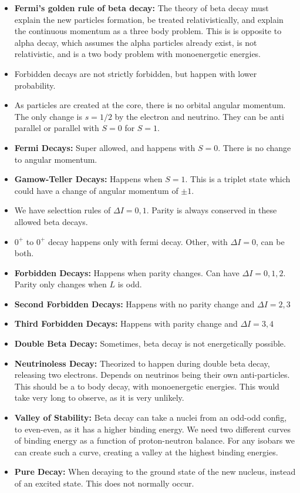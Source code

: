 \documentclass{article}
\begin{document}
\begin{itemize}
    \item \textbf{Fermi's golden rule of beta decay:} The theory of beta decay must explain the new particles formation, be treated relativistically, and explain the continuous momentum as a three body problem. This is is opposite to alpha decay, which assumes the alpha particles already exist, is not relativistic, and is a two body problem with monoenergetic energies. 
    \item Forbidden decays are not strictly forbidden, but happen with lower probability. 
    \item As particles are created at the core, there is no orbital angular momentum. The only change is $s = 1/2$ by the electron and neutrino. They can be anti parallel or parallel with $S = 0$ for $S = 1$. 
    \item \textbf{Fermi Decays:} Super allowed, and happens with $S = 0$. There is no change to angular momentum. 
    \item \textbf{Gamow-Teller Decays:} Happens when $S = 1$. This is a triplet state which could have a change of angular momentum of $±1$.
    \item We have selecttion rules of $ΔI = 0,1$. Parity is always conserved in these allowed beta decays. 
    \item $0^{+}$ to $0^{+}$ decay happens only with fermi decay. Other, with $ΔI = 0$, can be both. 
    \item \textbf{Forbidden Decays:} Happens when parity changes. Can have $ΔI = 0,1,2$. Parity only changes when $L$ is odd. 
    \item \textbf{Second Forbidden Decays:} Happens with no parity change and $ΔI = 2,3$
    \item \textbf{Third Forbidden Decays:} Happens with parity change and $ΔI = 3,4$
    \item \textbf{Double Beta Decay:} Sometimes, beta decay is not energetically possible.
    \item \textbf{Neutrinoless Decay:} Theorized to happen during double beta decay, releasing two electrons. Depends on neutrinos being their own anti-particles. This should be a to body decay, with monoenergetic energies. This would take very long to observe, as it is very unlikely. 
    \item \textbf{Valley of Stability:} Beta decay can take a nuclei from an odd-odd config, to even-even, as it has a higher binding energy. We need two different curves of binding energy as a function of proton-neutron balance. For any isobars we can create such a curve, creating a valley at the highest binding energies.  
    \item \textbf{Pure Decay:} When decaying to the ground state of the new nucleus, instead of an excited state. This does not normally occur. 
\end{itemize}
\end{document}

